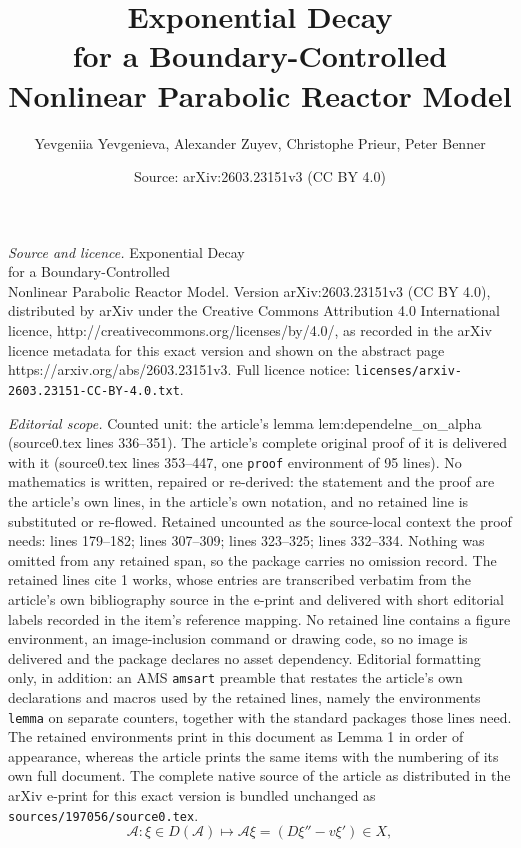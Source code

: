 \documentclass[10pt,a4paper]{amsart}
\title{Exponential Decay \\for a Boundary-Controlled \\Nonlinear Parabolic Reactor Model}
\author{Yevgeniia Yevgenieva, Alexander Zuyev, Christophe Prieur, Peter Benner}
\date{Source: arXiv:2603.23151v3 (CC BY 4.0)}
\begin{document}
\maketitle

\noindent\emph{Source and licence.} Exponential Decay \\for a Boundary-Controlled \\Nonlinear Parabolic Reactor Model. Version arXiv:2603.23151v3 (CC BY 4.0), distributed by arXiv under the Creative Commons Attribution 4.0 International licence, http://creativecommons.org/licenses/by/4.0/, as recorded in the arXiv licence metadata for this exact version and shown on the abstract page https://arxiv.org/abs/2603.23151v3. Full licence notice: \texttt{licenses/arxiv-2603.23151-CC-BY-4.0.txt}.\par\smallskip

\noindent\textit{Editorial scope.} Counted unit: the article's lemma lem:dependelne\_on\_alpha (source0.tex lines 336--351). The article's complete original proof of it is delivered with it (source0.tex lines 353--447, one \texttt{proof} environment of 95 lines). No mathematics is written, repaired or re-derived: the statement and the proof are the article's own lines, in the article's own notation, and no retained line is substituted or re-flowed.  Retained uncounted as the source-local context the proof needs: lines 179--182; lines 307--309; lines 323--325; lines 332--334.  Nothing was omitted from any retained span, so the package carries no omission record.  The retained lines cite 1 works, whose entries are transcribed verbatim from the article's own bibliography source in the e-print and delivered with short editorial labels recorded in the item's reference mapping.  No retained line contains a figure environment, an image-inclusion command or drawing code, so no image is delivered and the package declares no asset dependency.  Editorial formatting only, in addition: an AMS \texttt{amsart} preamble that restates the article's own declarations and macros used by the retained lines, namely the environments \texttt{lemma} on separate counters, together with the standard packages those lines need.  The retained environments print in this document as Lemma 1 in order of appearance, whereas the article prints the same items with the numbering of its own full document.  The complete native source of the article as distributed in the arXiv e-print for this exact version is bundled unchanged as \texttt{sources/197056/source0.tex}.
\begin{equation}\label{opA}
    \mathcal{A}:{\xi}\in D(\mathcal{A}) \mapsto \mathcal{A}{\xi} =
            (D\xi'' -v\xi')\in X,
\end{equation}
\end{document}
